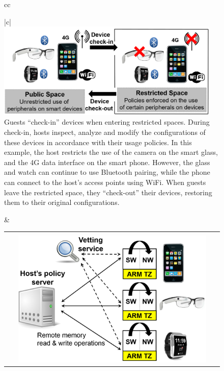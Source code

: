 \begin{figure}[t!]
\begin{center}
\begin{tabular}{cc}
\begin{minipage}{0.47\textwidth}
\centering
\begin{tabular}{|c|}
\hline
\indent\vspace{-0.2cm}\\
\includegraphics[keepaspectratio=true,width=0.95\textwidth]{figures/restricted-space.png}\\
{\small Guests ``check-in'' devices when entering restricted spaces. During
check-in, hosts inspect, analyze and modify the configurations of these devices
in accordance with their usage policies. In this example, the host restricts
the use of the camera on the smart glass, and the 4G data interface on the
smart phone. However, the glass and watch can continue to use Bluetooth
pairing, while the phone can connect to the host's access points using WiFi.
When guests leave the restricted space, they ``check-out'' their devices,
restoring them to their original configurations.}\\
\hline
\end{tabular}
\end{minipage} &
\begin{minipage}{0.47\textwidth}
\centering
\begin{tabular}{|c|}
\hline
\indent\vspace{-0.2cm}\\
\includegraphics[keepaspectratio=true,width=0.90\textwidth]{figures/host-guest.png}\\

\end{tabular}
\end{minipage}
\end{tabular}
\end{center}
\end{figure}
